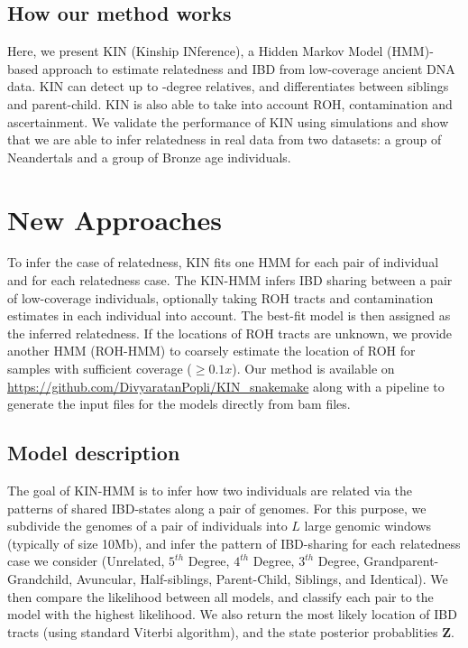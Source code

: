 \documentclass[12pt, letterpaper]{article}
\newcommand{\BZ}{\mathbf{Z}}
\begin{document}
\subsection{How our method works}
Here, we present KIN (Kinship INference), a Hidden Markov Model (HMM)-based approach to estimate relatedness and IBD from low-coverage ancient DNA data. KIN can detect up to -degree relatives, and differentiates between siblings and parent-child. KIN is also able to take into account ROH, contamination and ascertainment. We validate the performance of KIN using simulations and show that we are able to infer relatedness in real data from two datasets: a group of Neandertals and a group of Bronze age individuals.


\section{New Approaches}\label{new_approaches}

To infer the case of relatedness, KIN fits one HMM for each pair of individual and for each relatedness case. The KIN-HMM infers IBD sharing between a pair of low-coverage individuals, optionally taking ROH tracts and contamination estimates in each individual into account. The best-fit model is then assigned as the inferred relatedness. If the locations of ROH tracts are unknown, we provide another HMM (ROH-HMM) to coarsely estimate the location of ROH for samples with sufficient coverage ($\geq 0.1x$). Our method is available on \url{https://github.com/DivyaratanPopli/KIN_snakemake} along with a  \cite{koster_snakemakescalable_2012} pipeline to generate the input files for the models directly from bam files. 


\subsection{Model description}\label{method_overview} 

The goal of KIN-HMM is to infer how two individuals are related via the patterns of shared IBD-states along a pair of genomes. For this purpose,  we subdivide the genomes of a pair of individuals into $L$ large genomic windows (typically of size 10Mb), and infer the pattern of IBD-sharing for each relatedness case we consider (Unrelated, $5^{th}$ Degree, $4^{th}$ Degree, $3^{th}$ Degree, Grandparent-Grandchild, Avuncular, Half-siblings, Parent-Child, Siblings, and Identical). We then compare the likelihood between all models, and classify each pair to the model with the highest likelihood. We also return the most likely location of IBD tracts (using standard Viterbi algorithm), and the state posterior probablities $\BZ$. 
\end{document}
